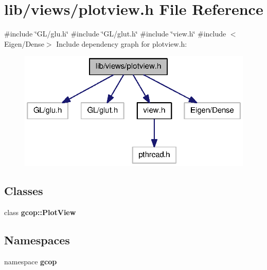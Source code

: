 \section{lib/views/plotview.h \-File \-Reference}
\label{plotview_8h}
{\ttfamily \#include \char`\"{}\-G\-L/glu.\-h\char`\"{}}\*
{\ttfamily \#include \char`\"{}\-G\-L/glut.\-h\char`\"{}}\*
{\ttfamily \#include \char`\"{}view.\-h\char`\"{}}\*
{\ttfamily \#include $<$\-Eigen/\-Dense$>$}\*
\-Include dependency graph for plotview.\-h\-:
\nopagebreak
\begin{figure}[H]
\begin{center}
\leavevmode
\includegraphics[width=322pt]{plotview_8h__incl}
\end{center}
\end{figure}
\subsection*{\-Classes}
\begin{DoxyCompactItemize}
\item 
class {\bf gcop\-::\-Plot\-View}
\end{DoxyCompactItemize}
\subsection*{\-Namespaces}
\begin{DoxyCompactItemize}
\item 
namespace {\bf gcop}
\end{DoxyCompactItemize}

